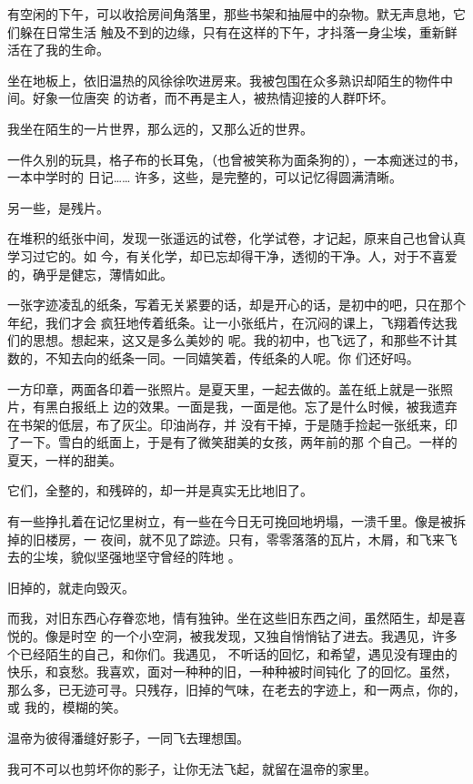 \documentclass[12pt,a4paper]{article}
\begin{document}

		有空闲的下午，可以收拾房间角落里，那些书架和抽屉中的杂物。默无声息地，它们躲在日常生活
	触及不到的边缘，只有在这样的下午，才抖落一身尘埃，重新鲜活在了我的生命。

		坐在地板上，依旧温热的风徐徐吹进房来。我被包围在众多熟识却陌生的物件中间。好象一位唐突
	的访者，而不再是主人，被热情迎接的人群吓坏。

		我坐在陌生的一片世界，那么远的，又那么近的世界。

		一件久别的玩具，格子布的长耳兔，（也曾被笑称为面条狗的），一本痴迷过的书，一本中学时的
	日记…… 许多，这些，是完整的，可以记忆得圆满清晰。

		另一些，是残片。

		在堆积的纸张中间，发现一张遥远的试卷，化学试卷，才记起，原来自己也曾认真学习过它的。如
	今，有关化学，却已忘却得干净，透彻的干净。人，对于不喜爱的，确乎是健忘，薄情如此。

		一张字迹凌乱的纸条，写着无关紧要的话，却是开心的话，是初中的吧，只在那个年纪，我们才会
	疯狂地传着纸条。让一小张纸片，在沉闷的课上，飞翔着传达我们的思想。想起来，这又是多么美妙的
	呢。我的初中，也飞远了，和那些不计其数的，不知去向的纸条一同。一同嬉笑着，传纸条的人呢。你
	们还好吗。

		一方印章，两面各印着一张照片。是夏天里，一起去做的。盖在纸上就是一张照片，有黑白报纸上
	边的效果。一面是我，一面是他。忘了是什么时候，被我遗弃在书架的低层，布了灰尘。印油尚存，并
	没有干掉，于是随手捡起一张纸来，印了一下。雪白的纸面上，于是有了微笑甜美的女孩，两年前的那
	个自己。一样的夏天，一样的甜美。

		它们，全整的，和残碎的，却一并是真实无比地旧了。

		有一些挣扎着在记忆里树立，有一些在今日无可挽回地坍塌，一溃千里。像是被拆掉的旧楼房，一
	夜间，就不见了踪迹。只有，零零落落的瓦片，木屑，和飞来飞去的尘埃，貌似坚强地坚守曾经的阵地
	。

		旧掉的，就走向毁灭。

		而我，对旧东西心存眷恋地，情有独钟。坐在这些旧东西之间，虽然陌生，却是喜悦的。像是时空
	的一个小空洞，被我发现，又独自悄悄钻了进去。我遇见，许多个已经陌生的自己，和你们。我遇见，
	不听话的回忆，和希望，遇见没有理由的快乐，和哀愁。我喜欢，面对一种种的旧，一种种被时间钝化
	了的回忆。虽然，那么多，已无迹可寻。只残存，旧掉的气味，在老去的字迹上，和一两点，你的，或
	我的，模糊的笑。

		温帝为彼得潘缝好影子，一同飞去理想国。

		我可不可以也剪坏你的影子，让你无法飞起，就留在温帝的家里。
\end{document}
